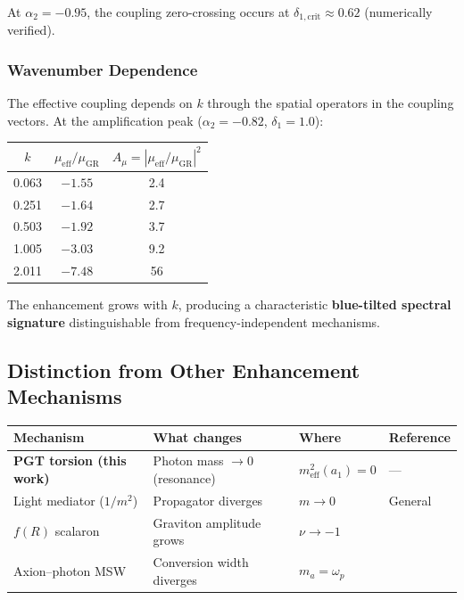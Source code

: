At $\alpha_2 = -0.95$, the coupling zero-crossing occurs at $\delta_{1,\text{crit}} \approx 0.62$ (numerically verified).

\subsubsection{Wavenumber Dependence}

The effective coupling depends on $k$ through the spatial operators in the coupling vectors. At the amplification peak ($\alpha_2 = -0.82$, $\delta_1 = 1.0$):
\begin{center}
\begin{tabular}{ccc}
\toprule
$k$ & $\mu_{\text{eff}}/\mu_{\text{GR}}$ & $A_\mu = |\mu_{\text{eff}}/\mu_{\text{GR}}|^2$ \\
\midrule
0.063 & $-1.55$ & 2.4 \\
0.251 & $-1.64$ & 2.7 \\
0.503 & $-1.92$ & 3.7 \\
1.005 & $-3.03$ & 9.2 \\
2.011 & $-7.48$ & 56 \\
\bottomrule
\end{tabular}
\end{center}
The enhancement grows with $k$, producing a characteristic \textbf{blue-tilted spectral signature} distinguishable from frequency-independent mechanisms.

\subsection{Distinction from Other Enhancement Mechanisms}
\label{subsec:comparison}

\begin{center}
\begin{tabular}{llll}
\toprule
Mechanism & What changes & Where & Reference \\
\midrule
\textbf{PGT torsion (this work)} & Photon mass $\to 0$ (resonance) & $m^2_{\text{eff}}(a_1) = 0$ & --- \\
Light mediator ($1/m^2$) & Propagator diverges & $m \to 0$ & General \\
$f(R)$ scalaron & Graviton amplitude grows & $\nu \to -1$ & \cite{cembranos2023graviton} \\
Axion--photon MSW & Conversion width diverges & $m_a = \omega_p$ & \cite{berlin2024axionphoton} \\
\bottomrule
\end{tabular}
\end{center}

